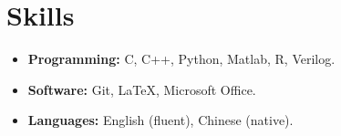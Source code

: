 \documentclass[a4paper,12pt]{ctexart}
\begin{document}
\section{\textbf{Skills}}
\begin{itemize}
    \item \textbf{Programming:} C, C++, Python, Matlab, R, Verilog. \vspace{-0.25cm}
    \item \textbf{Software:} Git, \LaTeX, Microsoft Office. \vspace{-0.25cm}
    \item \textbf{Languages:}  English (fluent), Chinese (native).
\end{itemize}
\end{document}
